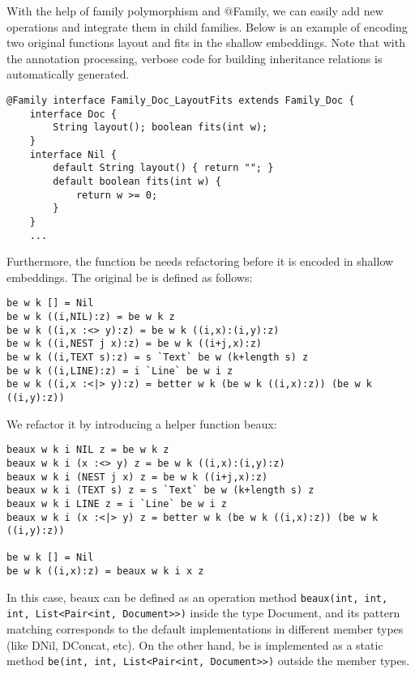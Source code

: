 With the help of family polymorphism and \textsf{@Family}, we can easily add new operations and integrate them
in child families. Below is an example of encoding two original functions \textsf{layout} and \textsf{fits} in
the shallow embeddings. Note that with the annotation processing, verbose code for building inheritance relations is
automatically generated.
\begin{lstlisting}
@Family interface Family_Doc_LayoutFits extends Family_Doc {
	interface Doc {
		String layout(); boolean fits(int w);
	}
	interface Nil {
		default String layout() { return ""; }
		default boolean fits(int w) {
			return w >= 0;
		}
	}
	...
\end{lstlisting}
Furthermore, the function \textsf{be} needs refactoring before it is encoded in shallow embeddings.
The original \textsf{be} is defined as follows:
\begin{lstlisting}
be w k [] = Nil
be w k ((i,NIL):z) = be w k z
be w k ((i,x :<> y):z) = be w k ((i,x):(i,y):z)
be w k ((i,NEST j x):z) = be w k ((i+j,x):z)
be w k ((i,TEXT s):z) = s `Text` be w (k+length s) z
be w k ((i,LINE):z) = i `Line` be w i z
be w k ((i,x :<|> y):z) = better w k (be w k ((i,x):z)) (be w k ((i,y):z))
\end{lstlisting}
We refactor it by introducing a helper function \textsf{beaux}:
\begin{lstlisting}
beaux w k i NIL z = be w k z
beaux w k i (x :<> y) z = be w k ((i,x):(i,y):z)
beaux w k i (NEST j x) z = be w k ((i+j,x):z)
beaux w k i (TEXT s) z = s `Text` be w (k+length s) z
beaux w k i LINE z = i `Line` be w i z
beaux w k i (x :<|> y) z = better w k (be w k ((i,x):z)) (be w k ((i,y):z))

be w k [] = Nil
be w k ((i,x):z) = beaux w k i x z
\end{lstlisting}
In this case, \textsf{beaux} can be defined as an operation method \lstinline{beaux(int, int, int, List<Pair<int, Document>>)} inside the type \textsf{Document}, and
its pattern matching corresponds to the default implementations in different member types (like \textsf{DNil}, \textsf{DConcat}, etc). On the other hand, \textsf{be} is implemented as a static method
\lstinline{be(int, int, List<Pair<int, Document>>)} outside the member types.

